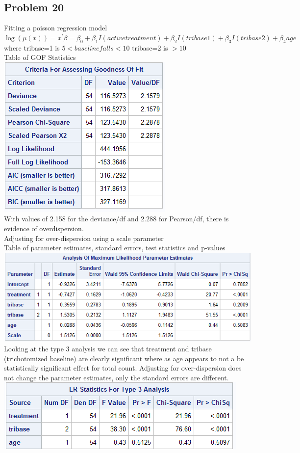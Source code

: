 \documentclass{article}
\begin{document}
\begin{flushleft}
\section*{Problem 20}
Fitting a poisson regression model\\
$\log(\mu(x))=x^{\prime}\beta=\beta_0+\beta_1 I(active treatment)+\beta_2 I(tribase1)+\beta_3 I(tribase2)+\beta_4 age$\\
where tribase=1 is $5<baseline falls<10$ tribase=2 is $>10$\\
Table of GOF Statistics\\
\includegraphics[scale=.6]{gofpois.png}\\
With values of 2.158 for the deviance/df and 2.288 for Pearson/df, there is
evidence of overdispersion.\\
Adjusting for over-dispersion using a scale parameter\\
Table of parameter estimates, standard errors, test statistics and p-values\\
\includegraphics[scale=.6]{pois2.png}\\
Looking at the type 3 analysis we can see that treatment and tribase (trichotomized baseline) are clearly significant where as age appears to not a be statistically significant effect for total count. Adjusting for over-dispersion does not change the parameter estimates, only the standard errors are different.\\
\includegraphics[scale=.6]{typ3pois.png}\\ 
\pagebreak

\end{flushleft}
\end{document}
